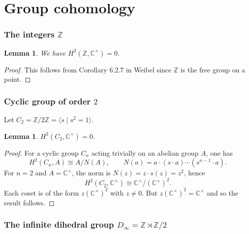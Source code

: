 \documentclass[11pt]{amsart}
\newtheorem{lemma}[theorem]{Lemma}
\theoremstyle{remark}
\theoremstyle{definition}
\newcommand{\Z}{\mathbb{Z}}
\newcommand{\C}{\mathbb{C}}
\begin{document}
\section{Group cohomology} 
\subsubsection{The integers $\Z$}   
\begin{lemma}\label{G0}  We have $H^2(\Z, \C^\times) = 0$.
\end{lemma}

\begin{proof}  This follows from Corollary 6.2.7 in Weibel \cite{W} since $\Z$ is the free group on a point.  
 \end{proof}

\subsubsection{Cyclic group of order $2$}
Let $C_2=\Z/2\Z=\langle s\mid s^2=1\rangle$.

\begin{lemma}\label{G1}
$H^2(C_2,\mathbb{C}^\times)=0$.
\end{lemma}
\begin{proof}  For a cyclic group $C_n$ acting trivially on an abelian group $A$, one has \cite[Theorem 6.2.2]{W}
\[
H^2(C_n,A)\cong A/N(A),
\qquad N(a)=a\cdot (s\cdot a)\cdots(s^{n-1}\cdot a).
\]
For $n=2$ and $A=\mathbb{C}^\times$, the norm is $N(z)= z \cdot s(z) = z^2$, hence
\[
H^2(C_2,\mathbb{C}^\times)\cong \mathbb{C}^\times/(\mathbb{C}^\times)^2.
\]
Each coset is of the form $z(\C^\times)^2$ with $z \neq 0$.   But $z(\C^\times)^2 = \C^\times$ and so  the result follows.
\end{proof}

\subsubsection{The infinite dihedral group $D_\infty=\Z\rtimes \Z/2$}
\end{document}
